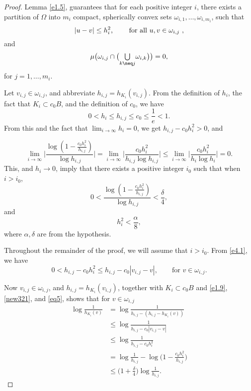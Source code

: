 \documentclass{cpamart1}     %
\theoremstyle{definition}
\theoremstyle{remark}
\newcommand*{\medcup}{\mathsmaller{\bigcup}}%
\begin{document}
\begin{proof}
Lemma \ref{e1.5}, guarantees that for each positive integer $i$, there exists a partition
of $\Omega$ into $m_i$ compact, spherically convex sets
$\omega_{i,1},\ldots, \omega_{i,m_i}$,
such that
\begin{equation}\label{e4.1}
\text{$|u-v|\leq h_i^2$, \qquad for all $u,v\in \omega_{i,j}$   },
\end{equation}
and
\begin{equation}\label{e4.2}
\mu\big(\omega_{i,j}\cap\big(\medcup\limits_{k\neq j}\omega_{i,k}\big)\big)=0,
\end{equation}
for $j=1,\ldots,m_i$.


Let $v_{i,j}\in\omega_{i,j}$, and abbreviate
$h_{i,j}=h_{K_i}(v_{i,j})$.
From the definition of $h_i$, the fact that $K_i\subset c_0B$, and the definition of $c_0$, we have
\[
0<h_i\leq h_{i,j}\leq c_0\le \frac{1}{e} <1.
\]
From this and the fact
that $\lim_{i\to \infty}h_i =0 $, we get
$h_{i,j}-c_0h_i^2>0$, and


\begin{equation*}
\lim_{i\to \infty}\bigg|\frac{\log(1-\frac{c_0h_i^2}{h_{i,j}})}{\log h_{i,j}}\bigg|
=\lim_{i\to \infty}\bigg|\frac{c_0h_i^2}{h_{i,j}\log h_{i,j}} \bigg|
\leq \lim_{i\to \infty}\bigg|\frac{c_0h_i^2}{h_i\log h_i}\bigg|=0.
\end{equation*}
This, and $h_i\rightarrow 0$, imply that there exists a positive integer $i_0$ such that when $i>i_0$,
\begin{equation}\label{eq5}
0<\frac{\log(1-\frac{c_0h_i^2}{h_{i,j}})}{\log h_{i,j}} <  \frac{\delta}{4},
\end{equation}
and
\begin{equation}
\label{eq6}
h_i^2<\frac{\alpha}{8},
\end{equation}
where $\alpha,\delta$ are from the hypothesis.

Throughout the remainder of the proof, we will assume that $i>i_0$.
From \eqref{e4.1}, we have
\begin{equation}\label{new321}
0<h_{i,j}-c_0h_i^2 \le h_{i,j}-c_0|v_{i,j}-v|, \qquad \text{for } v\in \omega_{i,j}.
\end{equation}


Now $v_{i,j}\in\omega_{i,j}$, and $h_{i,j}=h_{K_i}(v_{i,j})$, together with $K_i\subset c_0B$ and
\eqref{e1.9}, \eqref{new321},
and \eqref{eq5}, shows that for $v\in\omega_{i,j}$
\begin{equation}\label{e4.3}
\begin{aligned}
\log \frac1{h_{K_i}(v)}
&= \log \frac{1}{h_{i,j}-(h_{i,j}-h_{K_i}(v))}\\
&\le \log \frac{1}{h_{i,j} - c_0|v_{i,j}-v|} \\
&\leq \log \frac{1}{h_{i,j}-c_0h_i^2}\\
&=\log\frac{1}{h_{i,j}}-\log \big(1-\frac{c_0h_i^2}{h_{i,j}}\big)\\
&\leq \big(1+{\textstyle\frac{\delta}{4}}\big)\log \frac1{h_{i,j}}.
\end{aligned}
\end{equation}




\end{proof}
\end{document}
